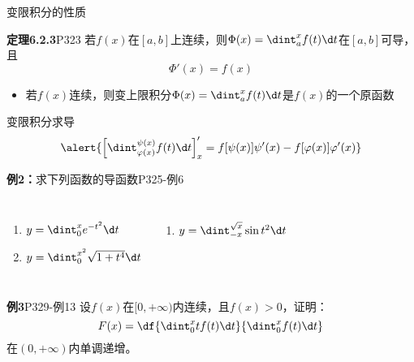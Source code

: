 \begin{frame}{变限积分的性质}
	\linespread{1.2}\pause 
	\begin{block}{{\bf 定理6.2.3}\hfill P323}
		若$f(x)$在$[a,b]$上连续，则$\Phi(x)=\dint_a^xf(t)\d t$在$[a,b]$可导，且
		$$\Phi'(x)=f(x)$$
	\end{block}\pause 
	\begin{itemize}
	  \item \alert{若$f(x)$连续，则变上限积分$\Phi(x)=\dint_a^xf(t)
	  \d t$是$f(x)$的一个原函数}
	\end{itemize}
\end{frame}

\begin{frame}{变限积分求导}
	\linespread{1.2}\pause 
	$$\alert{\left[\dint_{\varphi(x)}^{\psi(x)}f(t)\d t\right]'_x
	=f[\psi(x)]\psi'(x)-f[\varphi(x)]\varphi'(x)}$$\pause 
	\begin{exampleblock}{{\bf 例2：}求下列函数的导函数\hfill P325-例6}
		\begin{columns}[t]
				\begin{enumerate}\pause 
				  \item $y=\dint_0^{x}e^{-t^2}\d t$\pause 
				  \item $y=\dint_0^{x^2}\sqrt{1+t^4}\d t$\pause 
				\end{enumerate}
				\begin{enumerate}
				  \addtocounter{enumi}{2}
				  \item $y=\dint_{-x}^{\sqrt x}\sin t^2\d t$
				\end{enumerate}
		\end{columns}
	\end{exampleblock}
\end{frame}

\begin{frame}
	\linespread{1.2}
	\begin{exampleblock}{{\bf 例3}\hfill P329-例13}
		设$f(x)$在$[0,+\infty)$内连续，且$f(x)>0$，证明：
		$$F(x)=\df{\dint_0^xtf(t)\d t}{\dint_0^xf(t)\d t}$$
		在$(0,+\infty)$内单调递增。
	\end{exampleblock}
\end{frame}


